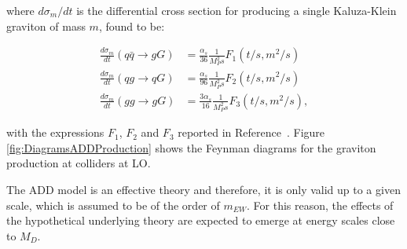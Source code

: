 \noindent where $d\sigma_m/dt$ is the differential cross section for producing a single Kaluza-Klein graviton of mass $m$, found to be:

\begin{equation}
\begin{split}
\frac{d\sigma_m}{dt}(q\bar{q} \rightarrow gG) &= \frac{\alpha_s}{36}\frac{1}{M_P^2 s}F_1(t/s, m^2/s) \\
\frac{d\sigma_m}{dt}(qg \rightarrow qG) &= \frac{\alpha_s}{96}\frac{1}{M_P^2 s}F_2(t/s, m^2/s)\\
\frac{d\sigma_m}{dt}(gg \rightarrow gG) &= \frac{3\alpha_s}{16}\frac{1}{M_P^2 s}F_3(t/s, m^2/s),
\end{split}
\label{eq:ADDCrossSectionIndividualProcess}
\end{equation}

\noindent with the expressions $F_1$, $F_2$ and $F_3$ reported in Reference~\cite{Giudice:1998ck}.
Figure \ref{fig:DiagramsADDProduction} shows the Feynman diagrams for the graviton production at colliders at LO.

The ADD model is an effective theory and therefore, it is only valid up to a given scale, which is assumed to be of the order of $m_{EW}$.
For this reason, the effects of the hypothetical underlying theory are expected to emerge at energy scales close to $M_D$.

